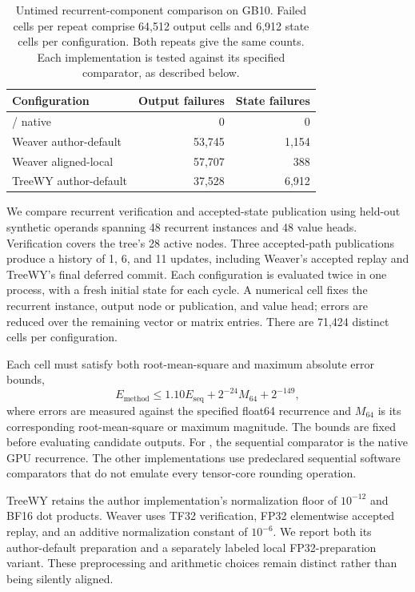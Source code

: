 \begin{table}[t]
\centering
\caption{Untimed recurrent-component comparison on GB10. Failed cells per repeat comprise 64,512 output cells and 6,912 state cells per configuration. Both repeats give the same counts. Each implementation is tested against its specified comparator, as described below.}
\label{tab:m1-qualification}
\small
\setlength{\tabcolsep}{3pt}
\begin{tabular}{@{}lrr@{}}
\toprule
Configuration & Output failures & State failures \\
\midrule
\sys{} / native & 0 & 0 \\
Weaver author-default & 53,745 & 1,154 \\
Weaver aligned-local & 57,707 & 388 \\
TreeWY author-default & 37,528 & 6,912 \\
\bottomrule
\end{tabular}
\end{table}

We compare recurrent verification and accepted-state publication using held-out synthetic operands spanning 48 recurrent instances and 48 value heads. Verification covers the tree's 28 active nodes. Three accepted-path publications produce a history of 1, 6, and 11 updates, including Weaver's accepted replay and TreeWY's final deferred commit. Each configuration is evaluated twice in one process, with a fresh initial state for each cycle. A numerical cell fixes the recurrent instance, output node or publication, and value head; errors are reduced over the remaining vector or matrix entries. There are 71,424 distinct cells per configuration.

Each cell must satisfy both root-mean-square and maximum absolute error bounds,
\begin{equation}
 E_{\mathrm{method}} \leq 1.10 E_{\mathrm{seq}} + 2^{-24}M_{64}+2^{-149},
\end{equation}
where errors are measured against the specified float64 recurrence and $M_{64}$ is its corresponding root-mean-square or maximum magnitude. The bounds are fixed before evaluating candidate outputs. For \sys{}, the sequential comparator is the native GPU recurrence. The other implementations use predeclared sequential software comparators that do not emulate every tensor-core rounding operation.

TreeWY retains the author implementation's normalization floor of $10^{-12}$ and BF16 dot products. Weaver uses TF32 verification, FP32 elementwise accepted replay, and an additive normalization constant of $10^{-6}$. We report both its author-default preparation and a separately labeled local FP32-preparation variant. These preprocessing and arithmetic choices remain distinct rather than being silently aligned.

